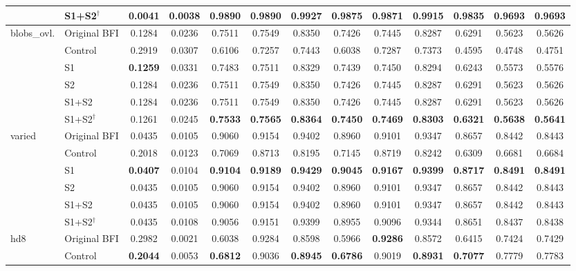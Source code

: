 \documentclass[journal]{IEEEtran}
\begin{document}
\begin{table}[!t]
\begin{tabular}{llccccccccccc}
 & S1+S2$^{\dagger}$ & 0.0041 & 0.0038 & 0.9890 & 0.9890 & 0.9927 & \textbf{0.9875} & \textbf{0.9871} & 0.9915 & 0.9835 & 0.9693 & 0.9693 \\
\midrule
\multirow{6}{*}{blobs\_ovl.} & Original BFI & 0.1284 & 0.0236 & 0.7511 & 0.7549 & 0.8350 & 0.7426 & 0.7445 & 0.8287 & 0.6291 & 0.5623 & 0.5626 \\
 & Control & 0.2919 & 0.0307 & 0.6106 & 0.7257 & 0.7443 & 0.6038 & 0.7287 & 0.7373 & 0.4595 & 0.4748 & 0.4751 \\
 & S1 & \textbf{0.1259} & 0.0331 & 0.7483 & 0.7511 & 0.8329 & 0.7439 & 0.7450 & 0.8294 & 0.6243 & 0.5573 & 0.5576 \\
 & S2 & 0.1284 & 0.0236 & 0.7511 & 0.7549 & 0.8350 & 0.7426 & 0.7445 & 0.8287 & 0.6291 & 0.5623 & 0.5626 \\
 & S1+S2 & 0.1284 & 0.0236 & 0.7511 & 0.7549 & 0.8350 & 0.7426 & 0.7445 & 0.8287 & 0.6291 & 0.5623 & 0.5626 \\
 & S1+S2$^{\dagger}$ & 0.1261 & 0.0245 & \textbf{0.7533} & \textbf{0.7565} & \textbf{0.8364} & \textbf{0.7450} & \textbf{0.7469} & \textbf{0.8303} & \textbf{0.6321} & \textbf{0.5638} & \textbf{0.5641} \\
\midrule
\multirow{6}{*}{varied} & Original BFI & 0.0435 & 0.0105 & 0.9060 & 0.9154 & 0.9402 & 0.8960 & 0.9101 & 0.9347 & 0.8657 & 0.8442 & 0.8443 \\
 & Control & 0.2018 & 0.0123 & 0.7069 & 0.8713 & 0.8195 & 0.7145 & 0.8719 & 0.8242 & 0.6309 & 0.6681 & 0.6684 \\
 & S1 & \textbf{0.0407} & 0.0104 & \textbf{0.9104} & \textbf{0.9189} & \textbf{0.9429} & \textbf{0.9045} & \textbf{0.9167} & \textbf{0.9399} & \textbf{0.8717} & \textbf{0.8491} & \textbf{0.8491} \\
 & S2 & 0.0435 & 0.0105 & 0.9060 & 0.9154 & 0.9402 & 0.8960 & 0.9101 & 0.9347 & 0.8657 & 0.8442 & 0.8443 \\
 & S1+S2 & 0.0435 & 0.0105 & 0.9060 & 0.9154 & 0.9402 & 0.8960 & 0.9101 & 0.9347 & 0.8657 & 0.8442 & 0.8443 \\
 & S1+S2$^{\dagger}$ & 0.0435 & 0.0108 & 0.9056 & 0.9151 & 0.9399 & 0.8955 & 0.9096 & 0.9344 & 0.8651 & 0.8437 & 0.8438 \\
\midrule
\multirow{6}{*}{hd8} & Original BFI & 0.2982 & 0.0021 & 0.6038 & 0.9284 & 0.8598 & 0.5966 & \textbf{0.9286} & 0.8572 & 0.6415 & 0.7424 & 0.7429 \\
 & Control & \textbf{0.2044} & 0.0053 & \textbf{0.6812} & 0.9036 & \textbf{0.8945} & \textbf{0.6786} & 0.9019 & \textbf{0.8931} & \textbf{0.7077} & 0.7779 & 0.7783 \\

\end{tabular}
\end{table}
\end{document}
